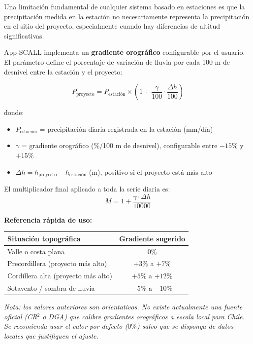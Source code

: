 \documentclass[12pt, a4paper]{article}
\begin{document}
Una limitación fundamental de cualquier sistema basado en estaciones es que la precipitación medida en la estación no necesariamente representa la precipitación en el sitio del proyecto, especialmente cuando hay diferencias de altitud significativas.

App-SCALL implementa un \textbf{gradiente orográfico} configurable por el usuario. El parámetro define el porcentaje de variación de lluvia por cada 100 m de desnivel entre la estación y el proyecto:

\begin{equation}
    P_{\text{proyecto}} = P_{\text{estación}} \times \left(1 + \frac{\gamma}{100} \cdot \frac{\Delta h}{100}\right)
\end{equation}

donde:
\begin{itemize}
    \item $P_{\text{estación}}$ = precipitación diaria registrada en la estación (mm/día)
    \item $\gamma$ = gradiente orográfico (\%/100 m de desnivel), configurable entre $-15\%$ y $+15\%$
    \item $\Delta h = h_{\text{proyecto}} - h_{\text{estación}}$ (m), positivo si el proyecto está más alto
\end{itemize}

El multiplicador final aplicado a toda la serie diaria es:
\begin{equation}
    M = 1 + \frac{\gamma \cdot \Delta h}{10000}
\end{equation}

\textbf{Referencia rápida de uso:}

\begin{center}
\begin{tabular}{lc}
\toprule
\textbf{Situación topográfica} & \textbf{Gradiente sugerido} \\
\midrule
Valle o costa plana & $0\%$ \\
Precordillera (proyecto más alto) & $+3\%$ a $+7\%$ \\
Cordillera alta (proyecto más alto) & $+5\%$ a $+12\%$ \\
Sotavento / sombra de lluvia & $-5\%$ a $-10\%$ \\
\bottomrule
\end{tabular}
\end{center}

\textit{Nota: los valores anteriores son orientativos. No existe actualmente una fuente oficial (CR$^2$ o DGA) que calibre gradientes orográficos a escala local para Chile. Se recomienda usar el valor por defecto ($0\%$) salvo que se disponga de datos locales que justifiquen el ajuste.}
\end{document}
